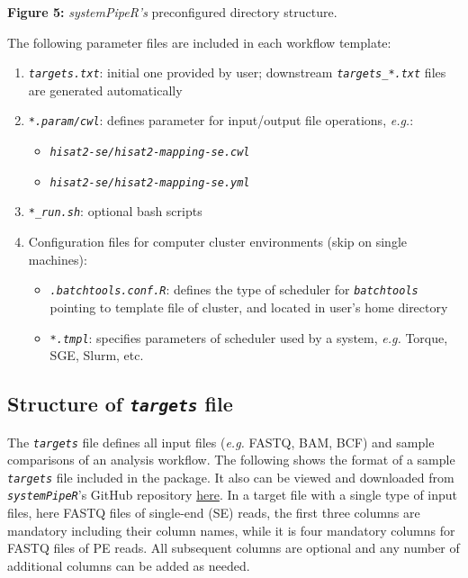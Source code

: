 \documentclass[14pt,]{article}
\providecommand{\tightlist}{%
  \setlength{\itemsep}{0pt}\setlength{\parskip}{0pt}}
\begin{document}
\textbf{Figure 5:} \emph{systemPipeR's} preconfigured directory structure.

The following parameter files are included in each workflow template:

\begin{enumerate}
\def\labelenumi{\arabic{enumi}.}
\tightlist
\item
  \emph{\texttt{targets.txt}}: initial one provided by user; downstream \emph{\texttt{targets\_*.txt}} files are generated automatically
\item
  \emph{\texttt{*.param/cwl}}: defines parameter for input/output file operations, \emph{e.g.}:

  \begin{itemize}
  \tightlist
  \item
    \emph{\texttt{hisat2-se/hisat2-mapping-se.cwl}}
  \item
    \emph{\texttt{hisat2-se/hisat2-mapping-se.yml}}
  \end{itemize}
\item
  \emph{\texttt{*\_run.sh}}: optional bash scripts
\item
  Configuration files for computer cluster environments (skip on single machines):

  \begin{itemize}
  \tightlist
  \item
    \emph{\texttt{.batchtools.conf.R}}: defines the type of scheduler for \emph{\texttt{batchtools}} pointing to template file of cluster, and located in user's home directory
  \item
    \emph{\texttt{*.tmpl}}: specifies parameters of scheduler used by a system, \emph{e.g.} Torque, SGE, Slurm, etc.
  \end{itemize}
\end{enumerate}

\hypertarget{structure-of-targets-file}{%
\subsection{\texorpdfstring{Structure of \emph{\texttt{targets}} file}{Structure of targets file}}\label{structure-of-targets-file}}

The \emph{\texttt{targets}} file defines all input files (\emph{e.g.} FASTQ, BAM, BCF) and sample
comparisons of an analysis workflow. The following shows the format of a sample
\emph{\texttt{targets}} file included in the package. It also can be viewed and downloaded
from \emph{\texttt{systemPipeR}}'s GitHub repository \href{https://github.com/tgirke/systemPipeR/blob/master/inst/extdata/targets.txt}{here}.
In a target file with a single type of input files, here FASTQ files of single-end (SE) reads, the first three columns are mandatory including their column
names, while it is four mandatory columns for FASTQ files of PE reads. All
subsequent columns are optional and any number of additional columns can be added as needed.
\end{document}
